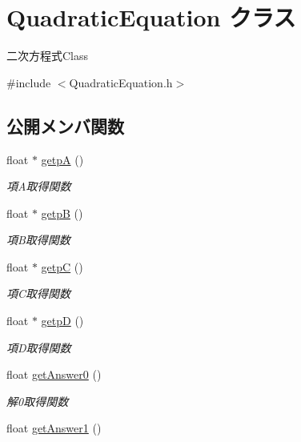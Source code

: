 \hypertarget{class_quadratic_equation}{}\section{Quadratic\+Equation クラス}
\label{class_quadratic_equation}


二次方程式\+Class  




{\ttfamily \#include $<$Quadratic\+Equation.\+h$>$}

\subsection*{公開メンバ関数}
\begin{DoxyCompactItemize}
\item 
float $\ast$ \mbox{\hyperlink{class_quadratic_equation_a5584822a5a5cf92350543d6093a594c6}{getpA}} ()
\begin{DoxyCompactList}\small\item\em 項\+A取得関数 \end{DoxyCompactList}\item 
float $\ast$ \mbox{\hyperlink{class_quadratic_equation_a443ffd465aee16fbb14107e5e889890b}{getpB}} ()
\begin{DoxyCompactList}\small\item\em 項\+B取得関数 \end{DoxyCompactList}\item 
float $\ast$ \mbox{\hyperlink{class_quadratic_equation_a35f690714e6a43da0e328ca36f1cd2e3}{getpC}} ()
\begin{DoxyCompactList}\small\item\em 項\+C取得関数 \end{DoxyCompactList}\item 
float $\ast$ \mbox{\hyperlink{class_quadratic_equation_a65188cf2bba1a681e4c8d0e403675413}{getpD}} ()
\begin{DoxyCompactList}\small\item\em 項\+D取得関数 \end{DoxyCompactList}\item 
float \mbox{\hyperlink{class_quadratic_equation_a50d11093835e2446dd99262413b39c1d}{get\+Answer0}} ()
\begin{DoxyCompactList}\small\item\em 解0取得関数 \end{DoxyCompactList}\item 
float \mbox{\hyperlink{class_quadratic_equation_ac40c9d76e2995d2c1319672ad81f8f60}{get\+Answer1}} ()

\end{DoxyCompactItemize}
